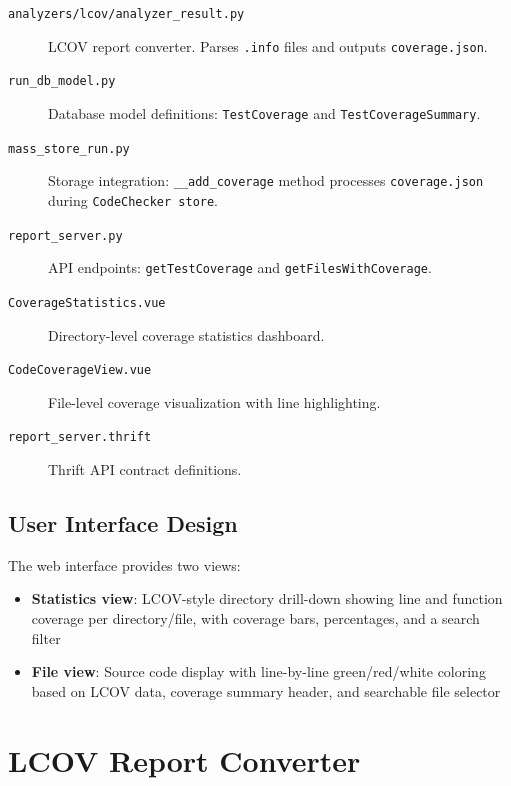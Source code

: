 \begin{description}
    \item[\texttt{analyzers/lcov/analyzer\_result.py}] LCOV report converter. Parses \texttt{.info} files and outputs \texttt{coverage.json}.

    \item[\texttt{run\_db\_model.py}] Database model definitions: \texttt{TestCoverage} and \texttt{TestCoverageSummary}.

    \item[\texttt{mass\_store\_run.py}] Storage integration: \texttt{\_\_add\_coverage} method processes \texttt{coverage.json} during \texttt{CodeChecker store}.

    \item[\texttt{report\_server.py}] API endpoints: \texttt{getTestCoverage} and \texttt{getFilesWithCoverage}.

    \item[\texttt{CoverageStatistics.vue}] Directory-level coverage statistics dashboard.

    \item[\texttt{CodeCoverageView.vue}] File-level coverage visualization with line highlighting.

    \item[\texttt{report\_server.thrift}] Thrift API contract definitions.
\end{description}

\subsection{User Interface Design}

The web interface provides two views:

\begin{itemize}
    \item \textbf{Statistics view}: LCOV-style directory drill-down showing line and function coverage per directory/file, with coverage bars, percentages, and a search filter
    \item \textbf{File view}: Source code display with line-by-line green/red/white coloring based on LCOV data, coverage summary header, and searchable file selector
\end{itemize}

\section{LCOV Report Converter}

